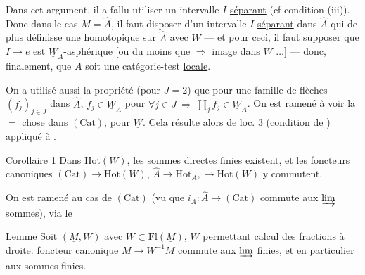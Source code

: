 Dans cet argument, il a fallu  utiliser un intervalle
$I$ \uline{séparant} (cf condition (iii)). Donc dans le cas $M=\widehat A$, il faut
disposer d'un intervalle $I$ \uline{séparant} dans $\widehat A$
 qui de plus définisse une 
homotopique sur $\widehat A$  avec $W$
--- et pour ceci, il faut supposer que
$I\longrightarrow e$ est $\underline W_A$-asphérique
[ou du moins que 
 
$\Rightarrow$ image dans $W$ $\ldots$] --- donc, finalement, que
 \margin{$\Vert$} $A$ soit une catégorie-test \uline{locale}.

On a utilisé aussi la propriété (pour  $J=2$) que pour une famille de
flèches $(f_j)_{j\in J}$ dans $\widehat A$, $f_j\in\underline W_A$ pour
$\forall j\in J\ \Longrightarrow\ \coprod_j f_j\in\underline W_A$.
On est ramené à voir la $=$ chose dans $(\mathrm{Cat})$, pour $\underline W$.
Cela résulte alors de loc. 3 (condition de ) appliqué à
.


\uline{Corollaire 1} Dans $\mathrm{Hot}(\underline W)$, les sommes directes finies existent, et les foncteurs canoniques $(\mathrm{Cat})\longrightarrow\mathrm{Hot}(\underline W)$, $\widehat A\longrightarrow\mathrm{Hot}_A,\longrightarrow\mathrm{Hot}(\underline W)$ y commutent.


On est ramené au cas de $(\mathrm{Cat})$ (vu que $i_A:\widehat A\longrightarrow(\mathrm{Cat})$ commute aux $\varinjlim$  sommes), via le

\margin{$|$}\uline{Lemme} Soit $(\underline M,W)$ avec $W\subset\mathrm{Fl}(\underline M)$, $W$ permettant calcul des fractions à droite.    foncteur canonique $M\longrightarrow W^{-1}M$ commute aux $\varinjlim$ finies,  et en particulier aux sommes finies.

